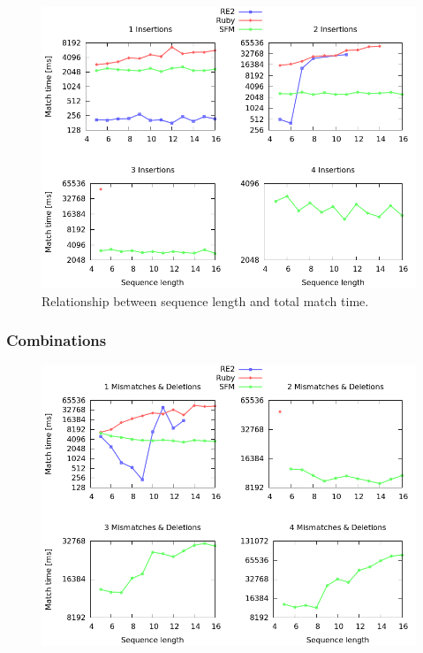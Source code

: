 \documentclass[12pt]{article}
\theoremstyle{definition}
\begin{document}
\begin{figure}[H]
	\begin{center}
		\includegraphics[scale=0.55]{graphs/seq_length_insertions.png}	
	\end{center}
	\caption{Relationship between sequence length and total match time.}
	\label{graph:cases:insertions}
\end{figure}

\subsubsection{Combinations}

\begin{figure}[H]
	\begin{center}
		\includegraphics[scale=0.55]{graphs/seq_length_mismatches_deletions.png}	
	\end{center}
	\caption{}
	\label{graph:cases:combinations}
\end{figure}
\end{document}
